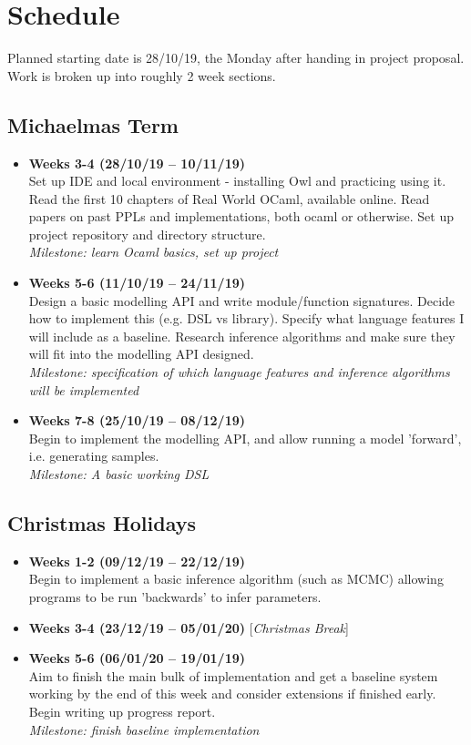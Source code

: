\section*{Schedule}
Planned starting date is {28/10/19}, the Monday after handing in project proposal. Work is broken up into roughly 2 week sections.

\subsection*{Michaelmas Term}
\begin{itemize}
	\item {\bf Weeks 3-4 (28/10/19 -- 10/11/19)} \\ Set up IDE and local environment - installing Owl and practicing using it. Read the first 10 chapters of Real World OCaml, available online. Read papers on past PPLs and implementations, both ocaml or otherwise. Set up project repository and directory structure.
	      \\ \textit{Milestone: learn Ocaml basics, set up project}
	\item \textbf{Weeks 5-6 (11/10/19 -- 24/11/19)}\\ Design a basic modelling API and write module/function signatures. Decide how to implement this (e.g. DSL vs library). Specify what language features I will include as a baseline. Research inference algorithms and make sure they will fit into the modelling API designed.
	      \\ \textit{Milestone: specification of which language features and inference algorithms will be implemented}
	\item \textbf{Weeks 7-8 (25/10/19 -- 08/12/19)}\\ Begin to implement the modelling API, and allow running a model 'forward', i.e. generating samples.
	      \\ \textit{Milestone: A basic working DSL}
\end{itemize}
\subsection*{Christmas Holidays}
\begin{itemize}
	\item \textbf{Weeks 1-2 (09/12/19 -- 22/12/19)}\\ Begin to implement a basic inference algorithm (such as MCMC) allowing programs to be run 'backwards' to infer parameters.
	\item \textbf{Weeks 3-4 (23/12/19 -- 05/01/20)} [\textit{Christmas Break}]
	\item \textbf{Weeks 5-6 (06/01/20 -- 19/01/19)}\\ Aim to finish the main bulk of implementation and get a baseline system working by the end of this week and consider extensions if finished early. Begin writing up progress report.
	      \\ \textit{Milestone: finish baseline implementation}
\end{itemize}
